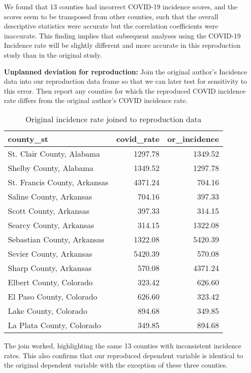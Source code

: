 \documentclass[
]{article}
\begin{document}
We found that 13 counties had incorrect COVID-19 incidence scores, and
the scores seem to be transposed from other counties, such that the
overall descriptive statistics were accurate but the correlation
coefficients were inaccurate. This finding implies that subsequent
analyses using the COVID-19 Incidence rate will be slightly different
and more accurate in this reproduction study than in the original study.

\textbf{Unplanned deviation for reproduction:} Join the original
author's Incidence data into our reproduction data frame so that we can
later test for sensitivity to this error. Then report any counties for
which the reproduced COVID incidence rate differs from the original
author's COVID incidence rate.

\begin{table}

\caption{\label{tab:join-incidence-rate}Original incidence rate joined to reproduction data}
\centering
\begin{tabular}[t]{l|r|r}
\hline
county\_st & covid\_rate & or\_incidence\\
\hline
St. Clair County, Alabama & 1297.78 & 1349.52\\
\hline
Shelby County, Alabama & 1349.52 & 1297.78\\
\hline
St. Francis County, Arkansas & 4371.24 & 704.16\\
\hline
Saline County, Arkansas & 704.16 & 397.33\\
\hline
Scott County, Arkansas & 397.33 & 314.15\\
\hline
Searcy County, Arkansas & 314.15 & 1322.08\\
\hline
Sebastian County, Arkansas & 1322.08 & 5420.39\\
\hline
Sevier County, Arkansas & 5420.39 & 570.08\\
\hline
Sharp County, Arkansas & 570.08 & 4371.24\\
\hline
Elbert County, Colorado & 323.42 & 626.60\\
\hline
El Paso County, Colorado & 626.60 & 323.42\\
\hline
Lake County, Colorado & 894.68 & 349.85\\
\hline
La Plata County, Colorado & 349.85 & 894.68\\
\hline
\end{tabular}
\end{table}

The join worked, highlighting the same 13 counties with inconsistent
incidence rates. This also confirms that our reproduced dependent
variable is identical to the original dependent variable with the
exception of these three counties.
\end{document}
